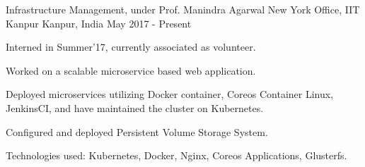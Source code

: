 

\begin{cventries}

  \cventry
    {Infrastructure Management, under Prof. Manindra Agarwal} %
    {New York Office, IIT Kanpur} %
    {Kanpur, India} %
    {May 2017 - Present} %
    {
      \begin{cvitems} %
        \item {Interned in Summer'17, currently associated as volunteer.}
        \item {Worked on a scalable microservice based web application.}
        \item {Deployed microservices utilizing Docker container, Coreos Container Linux, JenkinsCI, and have maintained the cluster on Kubernetes.}
        \item {Configured and deployed Persistent Volume Storage System.}
        \item {Technologies used: Kubernetes, Docker, Nginx, Coreos Applications, Glusterfs.}
      \end{cvitems}
    }

\end{cventries}
